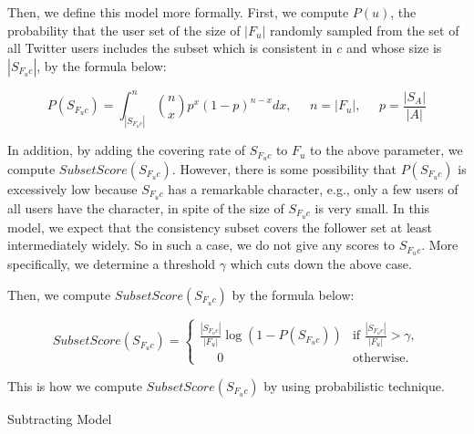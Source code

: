 Then, we define this model more formally.  First, we compute $P(u)$, the
probability that the user set of the size of $|F_u|$ randomly sampled
from the set of all Twitter users includes the subset which is
consistent in $c$ and whose size is $|S_{F_uc}|$, by the formula below:

\vspace{-1ex}
\[
 P(S_{F_uc}) = \int_{|S_{F_uc}|}^{n} \binom{n}{x} p^x (1-p)^{n - x}
 dx,\;\;\;\;\;n = |F_u|,\;\;\;\;\;p = \frac{|S_A|}{|A|}
\]
\vspace{-2ex}


In addition, by adding the covering rate of $S_{F_uc}$ to $F_u$ to the
above parameter, we compute $\mathit{SubsetScore(S_{F_uc})}$.  However,
there is some possibility that $P(S_{F_uc})$ is excessively low because
$S_{F_uc}$ has a remarkable character, e.g., only a few users of all
users have the character, in spite of the size of $S_{F_uc}$ is very
small.  In this model, we expect that the consistency subset covers the
follower set at least intermediately widely.  So in such a case, we do
not give any scores to $S_{F_uc}$.  More specifically, we determine a
threshold $\gamma$ which cuts down the above case.

Then, we compute $\mathit{SubsetScore(S_{F_uc})}$ by the formula below:


\vspace{-1ex}
\[
  \displaystyle \mathit{SubsetScore}(S_{F_uc}) = \begin{cases}
    \displaystyle \frac{|S_{F_uc}|}{|F_u|} \log (1 - P(S_{F_uc})) &
    \mbox{if } \displaystyle \frac{|S_{F_uc}|}{|F_u|} > \gamma, \\
    \displaystyle \;\;\;\;\;0 & \mbox{otherwise.}
  \end{cases}
\]
\vspace{-2ex}

This is how we compute $\mathit{SubsetScore(S_{F_uc})}$ by using
probabilistic technique.

\begin{description}
 \bf {\item[(ii)] Subtracting Model}
\end{description}

